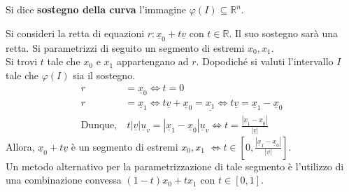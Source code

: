 \begin{definition}
    Si dice \textbf{sostegno della curva} l'immagine $\varphi(I) \subseteq \mathbb{R}^n$.
\end{definition}
\begin{example}
   Si consideri la retta di equazioni $r:\underline{x}_0+t\underline{v}$ con $t \in \mathbb{R}$. Il suo sostegno sarà una retta. Si parametrizzi di seguito un segmento di estremi $x_0, x_1$.\\
   Si trovi $t$ tale che $x_0$ e $x_1$ appartengano ad $r$. Dopodiché si valuti l'intervallo $I$ tale che $\varphi(I)$ sia il sostegno.
   \begin{equation*}
    \begin{aligned}  
        r&=\underline{x}_0 \iff t=0\\
        r&=\underline{x}_1 \iff t\underline{v}+\underline{x}_0=\underline{x_1}\iff t\underline{v}=\underline{x}_1-\underline{x}_0\\
        \text{Dunque,}&\ t|\underline{v}|\underline{u}_v=|\underline{x}_1-\underline{x}_0|\underline{u}_v \iff t=\frac{|\underline{x}_1-\underline{x}_0|}{|\underline{v}|}
    \end{aligned}
    \end{equation*}
    Allora, $\underline{x}_0 + t\underline{v}$ è un segmento di estremi $x_0, x_1$ $\iff t \in \left[0, \frac{|\underline{x}_1-\underline{x}_0|}{|\underline{v}|}\right]$.\\ 
   Un metodo alternativo per la parametrizzazione di tale segmento è l'utilizzo di una combinazione convessa $(1-t) x_0 + tx_1$ con $t \in [0,1]$.
\end{example}
